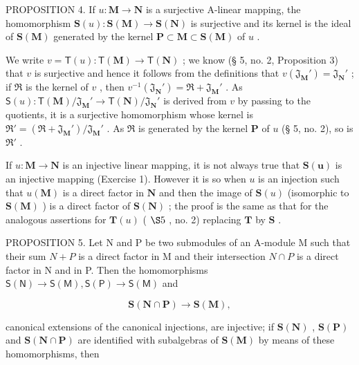 PROPOSITION 4. If \(u: \mathbf{M} \to \mathbf{N}\) is a surjective A-linear mapping, the homomorphism \(\mathbf{S}(u): \mathbf{S}(\mathbf{M}) \to \mathbf{S}(\mathbf{N})\) is surjective and its kernel is the ideal of \(\mathbf{S}(\mathbf{M})\) generated by the kernel \(\mathbf{P} \subset \mathbf{M} \subset \mathbf{S}(\mathbf{M})\) of \(u\) .

We write \(v = \mathsf{T}(u) \colon \mathsf{T}(\mathbf{M}) \to \mathsf{T}(\mathbf{N})\) ; we know (§ 5, no. 2, Proposition 3) that \(v\) is surjective and hence it follows from the definitions that \(v(\mathfrak{J}_{\mathbf{M}}') = \mathfrak{J}_{\mathbf{N}}'\) ; if \(\Re\) is the kernel of \(v\) , then \(v^{-1}(\mathfrak{J}_{\mathbf{N}}') = \Re + \mathfrak{J}_{\mathbf{M}}'\) . As \(\mathsf{S}(u) \colon \mathsf{T}(\mathbf{M}) / \mathfrak{J}_{\mathbf{M}}' \to \mathsf{T}(\mathbf{N}) / \mathfrak{J}_{\mathbf{N}}'\) is derived from \(v\) by passing to the quotients, it is a surjective homomorphism whose kernel is \(\Re' = (\Re + \mathfrak{J}_{\mathbf{M}}') / \mathfrak{J}_{\mathbf{M}}'\) . As \(\Re\) is generated by the kernel \(\mathbf{P}\) of \(u\) (§ 5, no. 2), so is \(\Re'\) .

If \(u: \mathbf{M} \to \mathbf{N}\) is an injective linear mapping, it is not always true that \(\mathbf{S}(\mathbf{u})\) is an injective mapping (Exercise 1). However it is so when \(u\) is an injection such that \(u(\mathbf{M})\) is a direct factor in \(\mathbf{N}\) and then the image of \(\mathbf{S}(u)\) (isomorphic to \(\mathbf{S}(\mathbf{M})\) ) is a direct factor of \(\mathbf{S}(\mathbf{N})\) ; the proof is the same as that for the analogous assertions for \(\mathbf{T}(u)\) ( \(\S 5\) , no. 2) replacing \(\mathbf{T}\) by \(\mathbf{S}\) .

PROPOSITION 5. Let N and P be two submodules of an A-module M such that their sum \(N + P\) is a direct factor in M and their intersection \(N \cap P\) is a direct factor in N and in P. Then the homomorphisms \(\mathsf{S}(\mathsf{N}) \to \mathsf{S}(\mathsf{M}), \mathsf{S}(\mathsf{P}) \to \mathsf{S}(\mathsf{M})\) and

\[
\mathbf {S} (\mathbf {N} \cap \mathbf {P}) \rightarrow \mathbf {S} (\mathbf {M}),
\]

canonical extensions of the canonical injections, are injective; if \(\mathbf{S}(\mathbf{N})\) , \(\mathbf{S}(\mathbf{P})\) and \(\mathbf{S}(\mathbf{N} \cap \mathbf{P})\) are identified with subalgebras of \(\mathbf{S}(\mathbf{M})\) by means of these homomorphisms, then

